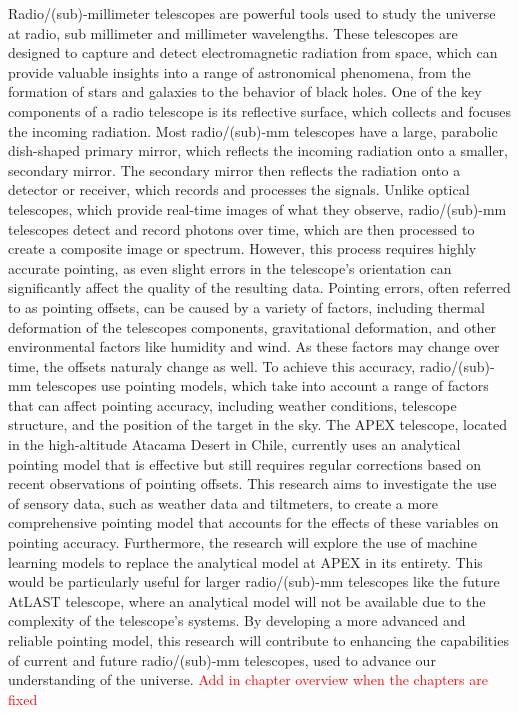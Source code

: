 Radio/(sub)-millimeter telescopes are powerful tools used to study the universe at radio, sub millimeter and millimeter wavelengths.
These telescopes are designed to capture and detect electromagnetic radiation from space, which can provide valuable insights into a range of astronomical phenomena,
from the formation of stars and galaxies to the behavior of black holes.
One of the key components of a radio telescope is its reflective surface, which collects and focuses the incoming radiation.
Most radio/(sub)-mm telescopes have a large, parabolic dish-shaped primary mirror, which reflects the incoming radiation onto a smaller, secondary mirror.
The secondary mirror then reflects the radiation onto a detector or receiver, which records and processes the signals.
Unlike optical telescopes, which provide real-time images of what they observe, radio/(sub)-mm telescopes detect and record photons over time,
which are then processed to create a composite image or spectrum.
However, this process requires highly accurate pointing, as even slight errors in the telescope's orientation can significantly affect the quality of the resulting data.
Pointing errors, often referred to as pointing offsets, can be caused by a variety of factors, including thermal deformation of the telescopes components,
gravitational deformation, and other environmental factors like humidity and wind. As these factors may change over time, the offsets naturaly change as well.
To achieve this accuracy, radio/(sub)-mm telescopes use pointing models, which take into account a range of factors that can affect pointing accuracy,
including weather conditions, telescope structure, and the position of the target in the sky.
The APEX telescope, located in the high-altitude Atacama Desert in Chile,
currently uses an analytical pointing model that is effective but still requires regular corrections based on recent observations of pointing offsets.
This research aims to investigate the use of sensory data, such as weather data and tiltmeters,
to create a more comprehensive pointing model that accounts for the effects of these variables on pointing accuracy.
Furthermore, the research will explore the use of machine learning models to replace the analytical model at APEX in its entirety.
This would be particularly useful for larger radio/(sub)-mm telescopes like the future AtLAST telescope, where an analytical model will not be available due to the complexity of the telescope's systems.
By developing a more advanced and reliable pointing model, this research will contribute to enhancing the capabilities of current and future radio/(sub)-mm telescopes, used to advance our understanding of the universe.
\textcolor{red}{Add in chapter overview when the chapters are fixed}